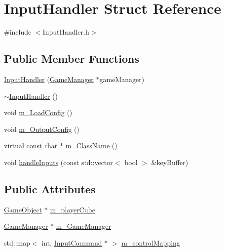 \hypertarget{struct_input_handler}{}\section{Input\+Handler Struct Reference}
\label{struct_input_handler}


{\ttfamily \#include $<$Input\+Handler.\+h$>$}

\subsection*{Public Member Functions}
\begin{DoxyCompactItemize}
\item 
\mbox{\hyperlink{struct_input_handler_a951e34a63d07195f594b1469a1e0b859}{Input\+Handler}} (\mbox{\hyperlink{class_game_manager}{Game\+Manager}} $\ast$game\+Manager)
\item 
\mbox{\hyperlink{struct_input_handler_ac1f7efb54b34d433d6ffba62627452b6}{$\sim$\+Input\+Handler}} ()
\item 
void \mbox{\hyperlink{struct_input_handler_ae8150d9263151be0d480a382f2c16b02}{m\+\_\+\+Load\+Config}} ()
\item 
void \mbox{\hyperlink{struct_input_handler_aa133e6d963446578ab282095ca5df05a}{m\+\_\+\+Output\+Config}} ()
\item 
virtual const char $\ast$ \mbox{\hyperlink{struct_input_handler_a4e77e8e4824b8287ae3a5d1af732677f}{m\+\_\+\+Class\+Name}} ()
\item 
void \mbox{\hyperlink{struct_input_handler_a250b665d3a9bc35bd8d6b544266e4faf}{handle\+Inputs}} (const std\+::vector$<$ bool $>$ \&key\+Buffer)
\end{DoxyCompactItemize}
\subsection*{Public Attributes}
\begin{DoxyCompactItemize}
\item 
\mbox{\hyperlink{class_game_object}{Game\+Object}} $\ast$ \mbox{\hyperlink{struct_input_handler_a02162590271ed44ae87ce77e89023026}{m\+\_\+player\+Cube}}
\item 
\mbox{\hyperlink{class_game_manager}{Game\+Manager}} $\ast$ \mbox{\hyperlink{struct_input_handler_ae2a439c9a0559ac885a1322d83cfce4b}{m\+\_\+\+Game\+Manager}}
\item 
std\+::map$<$ int, \mbox{\hyperlink{class_input_command}{Input\+Command}} $\ast$ $>$ \mbox{\hyperlink{struct_input_handler_abe853597d11b94e0668c8db6638a0548}{m\+\_\+control\+Mapping}}
\end{DoxyCompactItemize}


